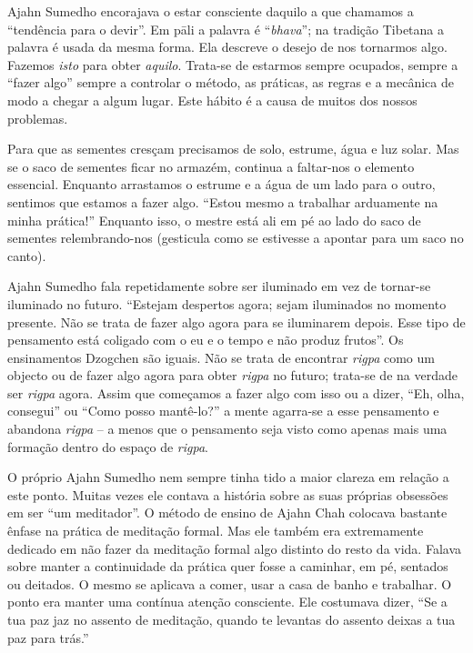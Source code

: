 Ajahn Sumedho encorajava o estar consciente daquilo a que chamamos a
``tendência para o devir''. Em pāli a palavra é ``\emph{bhava}''; na
tradição Tibetana a palavra é usada da mesma forma. Ela descreve o
desejo de nos tornarmos algo. Fazemos \emph{isto} para
obter \emph{aquilo}. Trata-se de estarmos sempre ocupados, sempre a
``fazer algo'' sempre a controlar o método, as práticas, as regras e a
mecânica de modo a chegar a algum lugar. Este hábito é a causa de muitos
dos nossos problemas.  

Para que as sementes cresçam precisamos de solo, estrume, água e luz
solar. Mas se o saco de sementes ficar no armazém, continua a faltar-nos
o elemento essencial. Enquanto arrastamos o estrume e a água de um lado
para o outro, sentimos que estamos a fazer algo. ``Estou mesmo a
trabalhar arduamente na minha prática!'' Enquanto isso, o mestre está
ali em pé ao lado do saco de sementes relembrando-nos (gesticula como se
estivesse a apontar para um saco no canto).

Ajahn Sumedho fala repetidamente sobre ser iluminado em vez de tornar-se
iluminado no futuro. ``Estejam despertos agora; sejam iluminados no
momento presente. Não se trata de fazer algo agora para se iluminarem
depois. Esse tipo de pensamento está coligado com o eu e o tempo e não
produz frutos''. Os ensinamentos Dzogchen são iguais. Não se trata de
encontrar \emph{rigpa} como um objecto ou de fazer algo agora para
obter \emph{rigpa} no futuro; trata-se de na verdade ser
\emph{rigpa} agora. Assim que começamos a fazer algo com isso ou a
dizer, ``Eh, olha, consegui'' ou ``Como posso mantê-lo?'' a mente
agarra-se a esse pensamento e abandona  \emph{rigpa} -- a menos que o
pensamento seja visto como apenas mais uma formação dentro do espaço
de \emph{rigpa}.

O próprio Ajahn Sumedho nem sempre tinha tido a maior clareza em relação
a este ponto. Muitas vezes ele contava a história sobre as suas próprias
obsessões em ser ``um meditador''. O método de ensino de Ajahn Chah
colocava bastante ênfase na prática de meditação formal. Mas ele também
era extremamente dedicado em não fazer da meditação formal algo distinto
do resto da vida. Falava sobre manter a continuidade da prática quer
fosse a caminhar, em pé, sentados ou deitados. O mesmo se aplicava a
comer, usar a casa de banho e trabalhar. O ponto era manter uma contínua
atenção consciente. \protect\hypertarget{R2}{}{}Ele costumava dizer,
``Se a tua paz jaz no assento de meditação, quando te levantas do
assento deixas a tua paz para trás.''


